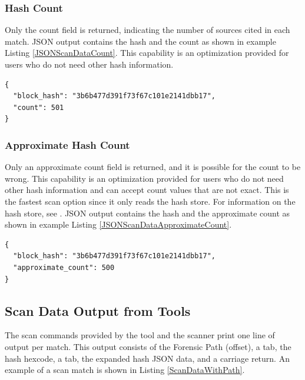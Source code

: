 \documentclass[11pt,fleqn]{article} %
\begin{document}
\subsubsection{Hash Count}
Only the count field is returned, indicating the number of sources cited in each match. JSON output contains the hash and the count as shown in example Listing \ref{JSONScanDataCount}. This capability is an optimization provided for users who do not need other hash information.

\lstset{style=customfile}
\begin{lstlisting}[float, caption={Example JSON block hash data count output from a scan match, with line breaks added for readability}, label=JSONScanDataCount]
{
  "block_hash": "3b6b477d391f73f67c101e2141dbb17",
  "count": 501
}
\end{lstlisting}

\subsubsection{Approximate Hash Count}
Only an approximate count field is returned, and it is possible for the count to be wrong. This capability is an optimization provided for users who do not need other hash information and can accept count values that are not exact. This is the fastest scan option since it only reads the hash store. For information on the hash store, see \textbf{}. JSON output contains the hash and the approximate count as shown in example Listing \ref{JSONScanDataApproximateCount}. 

\lstset{style=customfile}
\begin{lstlisting}[float, caption={Example JSON block hash data approximate count output from a scan match, with line breaks added for readability}, label=JSONScanDataApproximateCount]
{
  "block_hash": "3b6b477d391f73f67c101e2141dbb17",
  "approximate_count": 500
}
\end{lstlisting}

\subsection{Scan Data Output from Tools}
The scan commands provided by the \hdb tool and the \bulk \hdb scanner print one line of output per match. This output consists of the Forensic Path (offset), a tab, the hash hexcode, a tab, the expanded hash JSON data, and a carriage return. An example of a scan match is shown in Listing \ref{ScanDataWithPath}.\\
\end{document}
